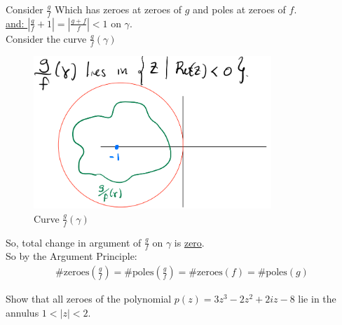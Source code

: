 \begin{example}
    Consider $\frac{g}{f}$ Which has zeroes at zeroes of $g$ and poles at zeroes of $f$.\\
    \underline{and: } $|\frac{g}{f} + 1| = |\frac{g+f}{f}| < 1$ on $\gamma$.\\
    Consider the curve $\frac{g}{f} (\gamma)$
    \begin{figure}[h]
        \centering
        \includegraphics[width=0.8\textwidth]{LECTURE_14/gamma.png}
        \caption{Curve $\frac{g}{f} (\gamma)$}
    \end{figure}
    So, total change in argument of $\frac{g}{f}$ on $\gamma$ is \underline{zero}.\\
    So by the Argument Principle:
    \begin{align*}
        \text{\#zeroes}(\frac{g}{f}) = \text{\#poles}(\frac{g}{f}) = \text{\#zeroes}(f) = \text{\#poles}(g)
    \end{align*}

\end{example}

\begin{example}
    Show that all zeroes of the polynomial $p(z) = 3z^3 - 2z^2 + 2iz -8$ lie in the annulus $1 < |z| < 2$.\\
\end{example}

